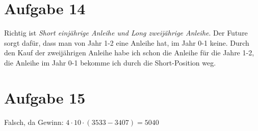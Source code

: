 \documentclass{article}
\begin{document}
	\section*{Aufgabe 14}
	Richtig ist \textit{Short einjährige Anleihe und Long zweijährige Anleihe}. Der Future sorgt dafür, dass man von Jahr 1-2 eine Anleihe hat, im Jahr 0-1 keine. Durch den Kauf der zweijährigen Anleihe habe ich schon die Anleihe für die Jahre 1-2, die Anleihe im Jahr 0-1 bekomme ich durch die Short-Position weg.
	
	\section*{Aufgabe 15}
	Falsch, da Gewinn: $4\cdot 10\cdot (3533 - 3407) = 5040$
	
\end{document}
